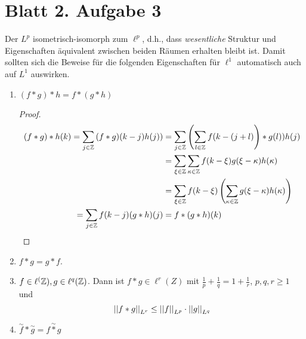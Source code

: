 \documentclass[
 ngerman]{report}
\begin{document}
\section*{Blatt 2. Aufgabe 3}
Der $L^p$ isometrisch-isomorph zum $\ell^p$, d.h., dass 
\emph{wesentliche} Struktur und Eigenschaften äquivalent zwischen beiden 
Räumen erhalten bleibt ist. Damit sollten sich die Beweise für
die folgenden Eigenschaften für $\ell^1$ automatisch auch auf
$L^1$ auswirken.

\begin{enumerate}[1)]
	\item $(f \ast g) \ast h = f \ast (g \ast h)$ 
		\vspace{-1mm}
		\begin{proof}%
			\[\begin{aligned}
				(f \ast g) \ast h (k) = \sum_{j\in\mathbb{Z}} 
					\left(f \ast g)(	k - j ) h(j) \right)
				&	= \sum_{j\in\mathbb{Z}} \left(\sum_{l \in \mathbb{Z}} f(k-(j+l)\right) \ast g(l)) h(j)
			  \\
				& = \sum_{\xi\in\mathbb{Z}} \sum_{\kappa \in \mathbb{Z}} 
					f(k-\xi) g(\xi - \kappa) h(\kappa) 
				\\
				& = \sum_{\xi\in\mathbb{Z}} f(k-\xi) \left(\sum_{\kappa \in \mathbb{Z}} 
					g(\xi - \kappa) h(\kappa) \right)
				\\
				 = \sum_{j\in\mathbb{Z}} f(k-j) (g \ast h) (j) 
				 & = f \ast (g \ast h) (k)
			\end{aligned}\]
		\end{proof}
	\item $f\ast g = g \ast f$. 
	\item $f \in \ell^(\mathbb{Z}), g \in \ell^q(\mathbb{Z})$. Dann ist $f\ast g \in \ell^r (Z)$ 
		mit $ \frac {1} {p} + \frac {1} {q} = 1 + \frac {1} {r}$, $p,q,r \geq 1$
		und 
		$$ \left\lvert \left\lvert f\ast g \right\rvert \right\rvert_{L^r} \leq \left\lvert \left\lvert f \right\rvert \right\rvert_{L^p} \cdot  \left\lvert \left\lvert g \right\rvert \right\rvert_{L^q}$$
	\item $\overset{\sim}{f} \ast \overset{\sim}{g} = \overset{\sim}{f\ast g}$
\end{enumerate}
\end{document}
